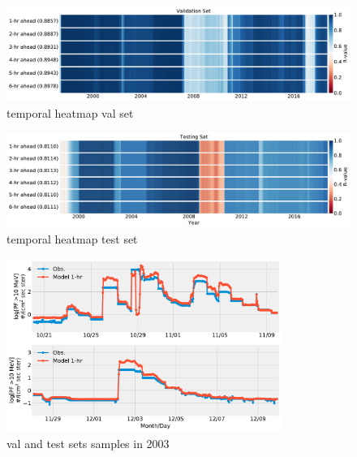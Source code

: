 \begin{table}[!htp]
	\centering
	\caption{MSE/MAE for the validation and test sets.}
	\label{tab:my-table}
\end{table}

\begin{figure}[!htp]
	\centering
	\includegraphics[width=\textwidth]{chapter4/figs/hourly_PF10/temporal_heatmap_val.pdf}
	\caption{temporal heatmap val set}
	\label{fig_4}
\end{figure}

\begin{figure}[!htp]
	\centering
	\includegraphics[width=\textwidth]{chapter4/figs/hourly_PF10/temporal_heatmap_test.pdf}
	\caption{temporal heatmap test set}
	\label{fig_5}
\end{figure}

\begin{figure}[!htp]
	\centering
	\includegraphics[width=0.8\textwidth]{chapter4/figs/hourly_PF10/sample_valandtestsets_2003.pdf}
	\caption{val and test sets samples in 2003}
	\label{fig_6}
\end{figure}





